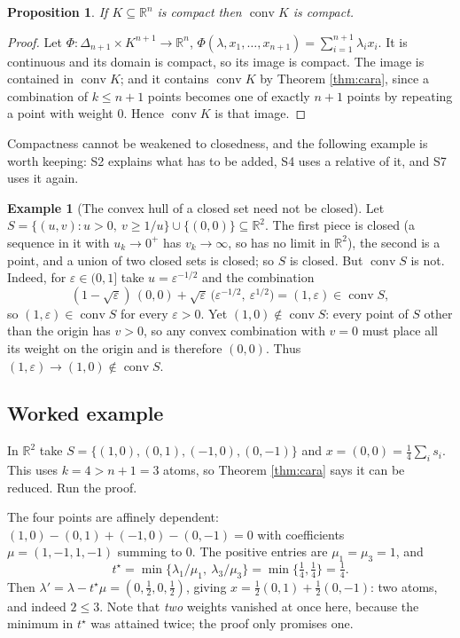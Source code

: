 \documentclass[11pt,a4paper]{article}
\theoremstyle{definition}
\newtheorem{example}[definition]{Example}
\theoremstyle{plain}
\newtheorem{proposition}[theorem]{Proposition}
\theoremstyle{remark}
\newcommand{\R}{\mathbb{R}}
\DeclareMathOperator{\conv}{conv}
\newcommand{\Simplex}{\Delta}
\begin{document}
\begin{proposition}
\label{prop:convcompact}
If $K\subseteq\R^n$ is compact then $\conv K$ is compact.
\end{proposition}

\begin{proof}
Let $\Phi:\Simplex_{n+1}\times K^{n+1}\to\R^n$, $\Phi(\lambda,x_1,\dots,x_{n+1})
=\sum_{i=1}^{n+1}\lambda_ix_i$. It is continuous and its domain is compact, so its image is
compact. The image is contained in $\conv K$; and it contains $\conv K$ by Theorem
\ref{thm:cara}, since a combination of $k\le n+1$ points becomes one of exactly $n+1$ points by
repeating a point with weight $0$. Hence $\conv K$ is that image.
\end{proof}

Compactness cannot be weakened to closedness, and the following example is worth keeping: S2
explains what has to be added, S4 uses a relative of it, and S7 uses it again.

\begin{example}[The convex hull of a closed set need not be closed]
\label{ex:hullnotclosed}
Let $S=\{(u,v):u>0,\ v\ge1/u\}\cup\{(0,0)\}\subseteq\R^2$. The first piece is closed (a
sequence in it with $u_k\to0^+$ has $v_k\to\infty$, so has no limit in $\R^2$), the second is a
point, and a union of two closed sets is closed; so $S$ is closed. But $\conv S$ is not.
Indeed, for $\varepsilon\in(0,1]$ take $u=\varepsilon^{-1/2}$ and the combination
\[
(1-\sqrt\varepsilon)\,(0,0)+\sqrt\varepsilon\,\big(\varepsilon^{-1/2},\ \varepsilon^{1/2}\big)
=(1,\varepsilon)\in\conv S ,
\]
so $(1,\varepsilon)\in\conv S$ for every $\varepsilon>0$. Yet $(1,0)\notin\conv S$: every point
of $S$ other than the origin has $v>0$, so any convex combination with $v=0$ must place all its
weight on the origin and is therefore $(0,0)$. Thus $(1,\varepsilon)\to(1,0)\notin\conv S$.
\end{example}

\subsection*{Worked example}

In $\R^2$ take $S=\{(1,0),(0,1),(-1,0),(0,-1)\}$ and $x=(0,0)=\tfrac14\sum_{i}s_i$. This uses
$k=4>n+1=3$ atoms, so Theorem \ref{thm:cara} says it can be reduced. Run the proof.

The four points are affinely dependent: $(1,0)-(0,1)+(-1,0)-(0,-1)=0$ with coefficients
$\mu=(1,-1,1,-1)$ summing to $0$. The positive entries are $\mu_1=\mu_3=1$, and
\[
t^\star=\min\{\lambda_1/\mu_1,\ \lambda_3/\mu_3\}=\min\{\tfrac14,\tfrac14\}=\tfrac14 .
\]
Then $\lambda'=\lambda-t^\star\mu=(0,\tfrac12,0,\tfrac12)$, giving
$x=\tfrac12(0,1)+\tfrac12(0,-1)$: two atoms, and indeed $2\le3$. Note that \emph{two} weights
vanished at once here, because the minimum in $t^\star$ was attained twice; the proof only
promises one.
\end{document}
